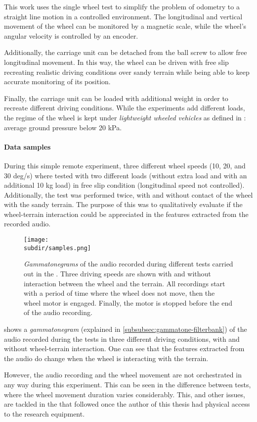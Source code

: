 This work uses the single wheel test to simplify the problem of odometry to a
straight line motion in a controlled environment. The longitudinal and vertical
movement of the wheel can be monitored by a magnetic scale, while the wheel's
angular velocity is controlled by an encoder.

Additionally, the carriage unit can be detached from the ball screw to allow
free longitudinal movement. In this way, the wheel can be driven with free slip
recreating realistic driving conditions over sandy terrain while being able to
keep accurate monitoring of its position.

Finally, the carriage unit can be loaded with additional weight in order to
recreate different driving conditions. While the experiments add different
loads, the regime of the wheel is kept under \emph{lightweight wheeled
vehicles} as defined in \cite{SENATORE2014}: average ground pressure below
20 kPa.

\paragraph{Data samples}
\label{para:wtb-0-data-samples}

During this simple remote experiment, three different wheel speeds (10, 20, and
30 deg/s) where tested with two different loads (without extra load and with an
additional 10 kg load) in free slip condition (longitudinal speed not
controlled). Additionally, the test was performed twice, with and without
contact of the wheel with the sandy terrain. The purpose of this was to
qualitatively evaluate if the wheel-terrain interaction could be appreciated in
the features extracted from the recorded audio.

\begin{figure}
    \centering
    \texttt{[image: \\subdir/samples.png]}
    \caption[Gammatonegrams from
        ]{\emph{Gammatonegrams} of
        the audio recorded during different tests carried out in the
        . Three driving speeds are
        shown with and without interaction between the wheel and the terrain.
        All recordings start with a period of time where the wheel does not
        move, then the wheel motor is engaged. Finally, the motor is stopped
        before the end of the audio recording.}
    \label{fig:wtb-0-data-samples}
\end{figure}


 shows a \emph{gammatonegram} (explained in
\cref{subsubsec:gammatone-filterbank}) of the audio recorded during the tests
in three different driving conditions, with and without wheel-terrain
interaction. One can see that the features extracted from the audio do change
when the wheel is interacting with the terrain.

However, the audio recording and the wheel movement are not orchestrated in any
way during this experiment. This can be seen in the difference between tests,
where the wheel movement duration varies considerably. This, and other issues,
are tackled in the  that followed
once the author of this thesis had physical access to the research equipment.
